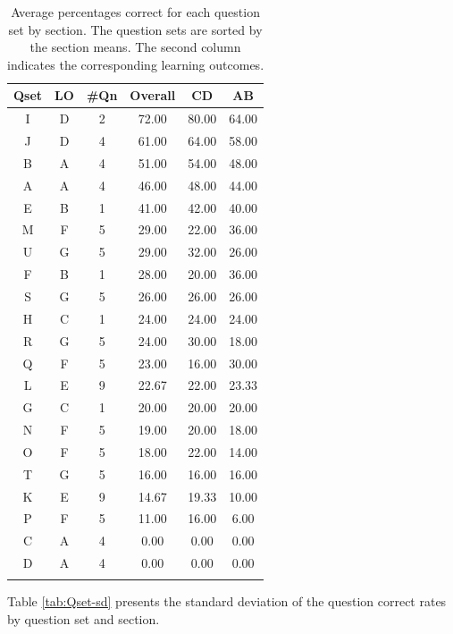 \documentclass[12pt,nohyper]{tufte-handout}\usepackage[]{graphicx}\usepackage[]{color}
\begin{document}
\begin{longtable}{cc|cc|cc}
  \hline
Qset & LO & \#Qn & Overall & CD & AB \\ 
  \hline
I & D &   2 & 72.00 & 80.00 & 64.00 \\ 
  J & D &   4 & 61.00 & 64.00 & 58.00 \\ 
  B & A &   4 & 51.00 & 54.00 & 48.00 \\ 
  A & A &   4 & 46.00 & 48.00 & 44.00 \\ 
  E & B &   1 & 41.00 & 42.00 & 40.00 \\ 
  M & F &   5 & 29.00 & 22.00 & 36.00 \\ 
  U & G &   5 & 29.00 & 32.00 & 26.00 \\ 
  F & B &   1 & 28.00 & 20.00 & 36.00 \\ 
  S & G &   5 & 26.00 & 26.00 & 26.00 \\ 
  H & C &   1 & 24.00 & 24.00 & 24.00 \\ 
  R & G &   5 & 24.00 & 30.00 & 18.00 \\ 
  Q & F &   5 & 23.00 & 16.00 & 30.00 \\ 
  L & E &   9 & 22.67 & 22.00 & 23.33 \\ 
  G & C &   1 & 20.00 & 20.00 & 20.00 \\ 
  N & F &   5 & 19.00 & 20.00 & 18.00 \\ 
  O & F &   5 & 18.00 & 22.00 & 14.00 \\ 
  T & G &   5 & 16.00 & 16.00 & 16.00 \\ 
  K & E &   9 & 14.67 & 19.33 & 10.00 \\ 
  P & F &   5 & 11.00 & 16.00 & 6.00 \\ 
  C & A &   4 & 0.00 & 0.00 & 0.00 \\ 
  D & A &   4 & 0.00 & 0.00 & 0.00 \\ 
   \hline
\hline
\caption{Average percentages correct for each question set by section. The question sets are sorted by the section means. The second column indicates the corresponding learning outcomes.} 
\label{tab:Qset-mean}
\end{longtable}


Table \ref{tab:Qset-sd} presents the standard deviation of the question correct rates by question set and section.
\end{document}
